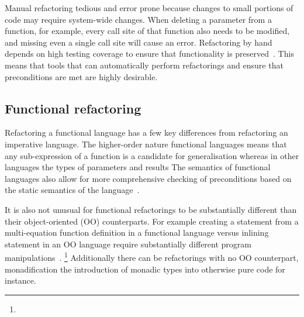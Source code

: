 Manual refactoring \DIFdelbegin {}\DIFdelend \DIFaddbegin {}\DIFaddend tedious and error prone because changes to small portions of code may require system-wide changes. When deleting a parameter from a function, for example, every call site of that function also needs to be modified, and missing even a single call site will cause an error. Refactoring by hand depends on high testing coverage to ensure that functionality is preserved~\citep{fowler}. This means that tools that can automatically perform refactorings and ensure that preconditions are met are highly desirable.

\subsection{Functional refactoring}

Refactoring a functional language has a few key differences from refactoring an imperative language. The higher-order nature \DIFaddbegin {}\DIFaddend functional languages means that any sub-expression of a function is a candidate for generalisation whereas in other languages the types of parameters and results \DIFdelbegin {}\DIFdelend \DIFaddbegin {}\DIFaddend The semantics of functional languages also allow for more comprehensive checking of preconditions based on the static semantics of the language~\citep{refacTools}.

It is also not unusual for functional refactorings to be substantially different than their object-oriented (OO) counterparts. For example creating a \DIFdelbegin {}\DIFdelend \DIFaddbegin \texttt{} \DIFaddend statement from a multi-equation function definition in a functional language versus inlining \DIFdelbegin {}\DIFdelend \DIFaddbegin {}\texttt{} \DIFaddend statement in an OO language require substantially different program manipulations~\citep{huiqingThesis}. \DIFaddbegin {}\texttt{} \footnote{} \DIFaddend Additionally there can be refactorings with no OO counterpart, monadification the introduction of monadic types into otherwise pure code \DIFdelbegin \DIFdel{, }\DIFdelend for instance.

